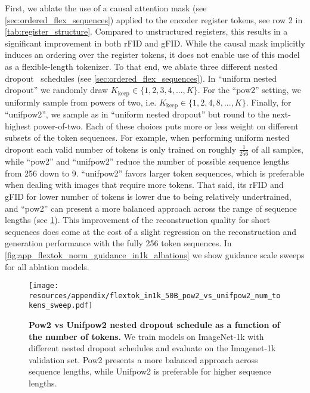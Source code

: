 First, we ablate the use of a causal attention mask (see \cref{sec:ordered_flex_sequences}) applied to the encoder register tokens, see row 2 in \cref{tab:register_structure}. Compared to unstructured registers, this results in a significant improvement in both rFID and gFID. While the causal mask implicitly induces an ordering over the register tokens, it does not enable use of this model as a flexible-length tokenizer. To that end, we ablate three different nested dropout~\cite{Rippel2014NestedDropout} schedules (see \cref{sec:ordered_flex_sequences}). In ``uniform nested dropout'' we randomly draw $K_\text{keep} \in \{1,2,3,4,...,K\}$. For the ``pow2'' setting, we uniformly sample from powers of two, i.e. $K_\text{keep} \in \{1,2,4,8,...,K\}$. Finally, for ``unifpow2'', we sample as in ``uniform nested dropout'' but round to the next-highest power-of-two. Each of these choices puts more or less weight on different subsets of the token sequences. For example, when performing uniform nested dropout each valid number of tokens is only trained on roughly $\frac{1}{256}$ of all samples, while ``pow2'' and ``unifpow2'' reduce the number of possible sequence lengths from 256 down to 9. ``unifpow2'' favors larger token sequences, which is preferable when dealing with images that require more tokens. That said, its rFID and gFID for lower number of tokens is lower due to being relatively undertrained, and ``pow2'' can present a more balanced approach across the range of sequence lengths (see \cref{fig:app_flextok_norm_guidance_in1k_pow2_vs_unifpow2}). This improvement of the reconstruction quality for short sequences does come at the cost of a slight regression on the reconstruction and generation performance with the fully 256 token sequences.
In \cref{fig:app_flextok_norm_guidance_in1k_albations} we show guidance scale sweeps for all ablation models.


\begin{figure}[ht!]
\centering
\texttt{[image: resources/appendix/flextok\_in1k\_50B\_pow2\_vs\_unifpow2\_num\_tokens\_sweep.pdf]}
\caption{
\textbf{Pow2 vs Unifpow2 nested dropout schedule as a function of the number of tokens.} We train \oursbase models on ImageNet-1k with different nested dropout schedules and evaluate on the Imagenet-1k validation set. Pow2 presents a more balanced approach across sequence lengths, while Unifpow2 is preferable for higher sequence lengths.
}
\label{fig:app_flextok_norm_guidance_in1k_pow2_vs_unifpow2}
\end{figure}

